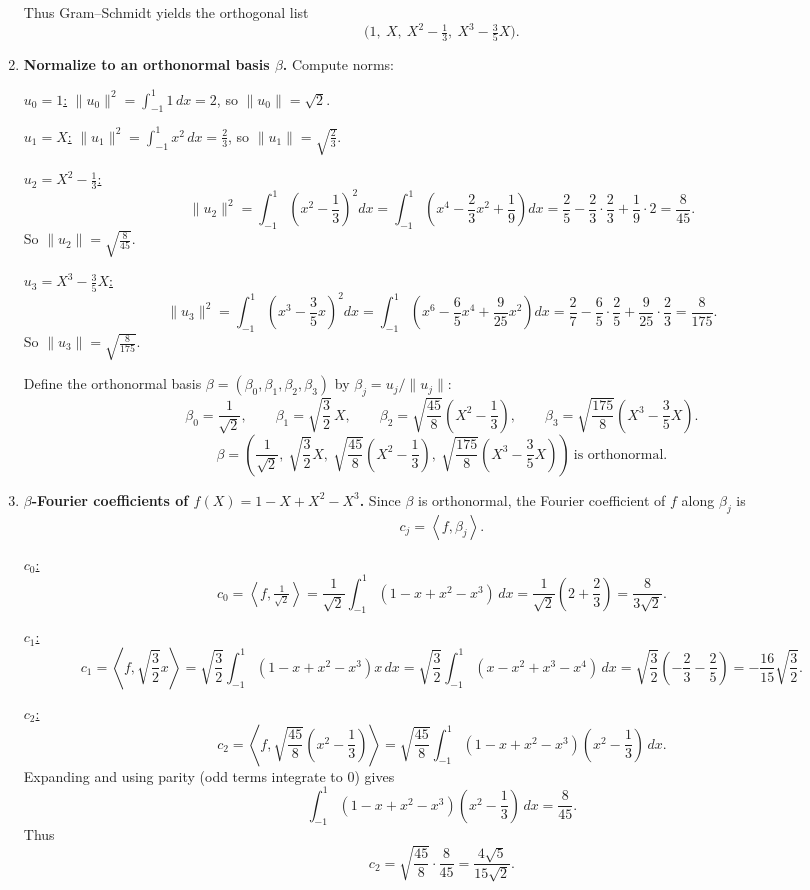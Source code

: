 \documentclass[12pt]{article}
\newcommand{\ip}[2]{\left\langle #1,#2\right\rangle}
\begin{document}
\begin{enumerate}[label=(\alph*)]
Thus Gram--Schmidt yields the orthogonal list
\[
\boxed{\,\bigl(1,\ X,\ X^2-\tfrac13,\ X^3-\tfrac35 X\bigr).\,}
\]

\item \textbf{Normalize to an orthonormal basis $\beta$.}
Compute norms:

\underline{$u_0=1$:} $\|u_0\|^2=\int_{-1}^1 1\,dx=2$, so $\|u_0\|=\sqrt2$.

\underline{$u_1=X$:} $\|u_1\|^2=\int_{-1}^1 x^2\,dx=\frac{2}{3}$, so $\|u_1\|=\sqrt{\frac{2}{3}}$.

\underline{$u_2=X^2-\frac13$:}
\[
\|u_2\|^2=\int_{-1}^1 \left(x^2-\frac13\right)^2dx
=\int_{-1}^1\left(x^4-\frac{2}{3}x^2+\frac{1}{9}\right)dx
=\frac{2}{5}-\frac{2}{3}\cdot\frac{2}{3}+\frac{1}{9}\cdot 2
=\frac{8}{45}.
\]
So $\|u_2\|=\sqrt{\frac{8}{45}}$.

\underline{$u_3=X^3-\frac35 X$:}
\[
\|u_3\|^2=\int_{-1}^1\left(x^3-\frac{3}{5}x\right)^2dx
=\int_{-1}^1\left(x^6-\frac{6}{5}x^4+\frac{9}{25}x^2\right)dx
=\frac{2}{7}-\frac{6}{5}\cdot\frac{2}{5}+\frac{9}{25}\cdot\frac{2}{3}
=\frac{8}{175}.
\]
So $\|u_3\|=\sqrt{\frac{8}{175}}$.

Define the orthonormal basis $\beta=(\beta_0,\beta_1,\beta_2,\beta_3)$ by $\beta_j=u_j/\|u_j\|$:
\[
\beta_0=\frac{1}{\sqrt2},\qquad
\beta_1=\sqrt{\frac{3}{2}}\,X,\qquad
\beta_2=\sqrt{\frac{45}{8}}\left(X^2-\frac13\right),\qquad
\beta_3=\sqrt{\frac{175}{8}}\left(X^3-\frac35 X\right).
\]
\[
\boxed{\,\beta=\left(\frac{1}{\sqrt2},\ \sqrt{\frac{3}{2}}X,\ \sqrt{\frac{45}{8}}\left(X^2-\frac13\right),\ \sqrt{\frac{175}{8}}\left(X^3-\frac35 X\right)\right)\ \text{is orthonormal.}\,}
\]

\item \textbf{$\beta$-Fourier coefficients of $f(X)=1-X+X^2-X^3$.}
Since $\beta$ is orthonormal, the Fourier coefficient of $f$ along $\beta_j$ is
\[
c_j=\ip{f}{\beta_j}.
\]

\underline{$c_0$:}
\[
c_0=\ip{f}{\tfrac{1}{\sqrt2}}=\frac{1}{\sqrt2}\int_{-1}^1 (1-x+x^2-x^3)\,dx
=\frac{1}{\sqrt2}\left(2+\frac{2}{3}\right)=\frac{8}{3\sqrt2}.
\]

\underline{$c_1$:}
\[
c_1=\ip{f}{\sqrt{\frac32}x}=\sqrt{\frac32}\int_{-1}^1 (1-x+x^2-x^3)x\,dx
=\sqrt{\frac32}\int_{-1}^1(x-x^2+x^3-x^4)\,dx
=\sqrt{\frac32}\left(-\frac{2}{3}-\frac{2}{5}\right)
=-\frac{16}{15}\sqrt{\frac32}.
\]

\underline{$c_2$:}
\[
c_2=\ip{f}{\sqrt{\frac{45}{8}}\left(x^2-\frac13\right)}
=\sqrt{\frac{45}{8}}\int_{-1}^1 (1-x+x^2-x^3)\left(x^2-\frac13\right)\,dx.
\]
Expanding and using parity (odd terms integrate to $0$) gives
\[
\int_{-1}^1 (1-x+x^2-x^3)\left(x^2-\frac13\right)\,dx
=\frac{8}{45}.
\]
Thus
\[
c_2=\sqrt{\frac{45}{8}}\cdot \frac{8}{45}=\frac{4\sqrt5}{15\sqrt2}.
\]


\end{enumerate}
\end{document}
